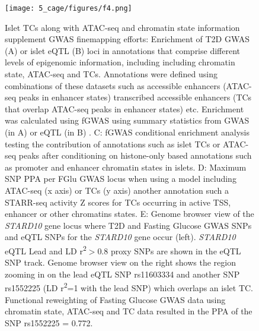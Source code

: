 \begin{figure}
        \centering
        \texttt{[image: 5\_cage/figures/f4.png]}
        \caption[Islet TCs along with ATAC-seq and chromatin state information supplement GWAS finemapping efforts]{Islet TCs along with ATAC-seq and chromatin state information supplement GWAS finemapping efforts: Enrichment of T2D GWAS (A) or islet eQTL (B) loci in annotations that comprise different levels of epigenomic information, including including chromatin state, ATAC-seq and TCs. Annotations were defined using combinations of these datasets such as accessible enhancers (ATAC-seq peaks in enhancer states) transcribed accessible enhancers (TCs that overlap ATAC-seq peaks in enhancer states) etc. Enrichment was calculated using fGWAS \cite{pickrellJointAnalysisFunctional2014} using summary statistics from GWAS (in A) \cite{mahajanFinemappingTypeDiabetes2018} or eQTL (in B) \cite{varshneyGeneticRegulatorySignatures2017}. C: fGWAS conditional enrichment analysis testing the contribution of annotations such as islet TCs or ATAC-seq peaks after conditioning on histone-only based annotations such as promoter and enhancer chromatin states in islets. D: Maximum SNP PPA per FGlu GWAS locus when using a model including ATAC-seq (x axis) or TCs (y axis)  another annotation such a STARR-seq activity Z scores for TCs occurring in active TSS, enhancer or other chromatins states. E: Genome browser view of the \textit{STARD10} gene locus where T2D and Fasting Glucose GWAS SNPs and eQTL SNPs for the \textit{STARD10} gene occur (left). \textit{STARD10} eQTL Lead and LD r\textsuperscript{2}$>$0.8 proxy SNPs are shown in the eQTL SNP track. Genome browser view on the right shows the region zooming in on the lead eQTL SNP rs11603334 and another SNP rs1552225 (LD  r\textsuperscript{2}=1 with the lead SNP) which overlaps an islet TC. Functional reweighting of Fasting Glucose GWAS data using chromatin state, ATAC-seq and TC data resulted in the PPA of the SNP rs1552225 = 0.772.}
        \label{fig:c5_f4}
\end{figure}


